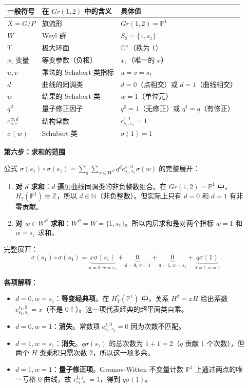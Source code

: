 \begin{center}
\begin{tabular}{p{3.5cm}p{5cm}p{5cm}}
\hline
\textbf{一般符号} & \textbf{在 $Gr(1,2)$ 中的含义} & \textbf{具体值} \\ \hline
$X = G/P$ & 旗流形 & $Gr(1,2) = \mathbb{P}^1$ \\
$W$ & Weyl 群 & $S_2 = \{1, s_1\}$ \\
$T$ & 极大环面 & $\mathbb{C}^\times$（秩为 1）\\
$x_i$ 变量 & 等变参数（负根） & $x_1$（唯一的 $x$）\\
$u, v$ & 乘法的 Schubert 类指标 & $u = v = s_1$ \\
$d$ & 曲线的同调类 & $d = 0$（点相交）或 $d = 1$（曲线相交）\\
$w$ & 结果的 Schubert 类 & $w = 1$（单位元）\\
$q^d$ & 量子修正因子 & $q^0 = 1$（无修正）或 $q^1 = q$（有修正）\\
$c_{u,v}^{w,d}$ & 结构常数 & $c_{s_1,s_1}^{1,1} = 1$ \\
$\sigma(w)$ & Schubert 类 & $\sigma(1) = 1$ \\
\hline
\end{tabular}
\end{center}

\textbf{第六步：求和的范围}

公式 $\sigma(s_1) \circ \sigma(s_1) = \sum_{d}\sum_{w \in W^P} q^d c_{s_1,s_1}^{w,d} \sigma(w)$ 的完整展开：

\begin{enumerate}
\item \textbf{对 $d$ 求和}：$d$ 遍历曲线同调类的非负整数组合。在 $Gr(1,2) = \mathbb{P}^1$ 中，$H_2(\mathbb{P}^1) \cong \mathbb{Z}$，所以 $d \in \mathbb{N}$（非负整数）。但实际上只有 $d = 0$ 和 $d = 1$ 有非零贡献。

\item \textbf{对 $w \in W^P$ 求和}：$W^{P} = W = \{1, s_1\}$。所以内层求和是对两个指标 $w = 1$ 和 $w = s_1$ 求和。
\end{enumerate}

完整展开：
$$\sigma(s_1) \circ \sigma(s_1) = \underbrace{x\sigma(s_1)}_{d=0, w=s_1} + \underbrace{0}_{d=0, w=1} + \underbrace{0}_{d=1, w=s_1} + \underbrace{q\sigma(1)}_{d=1, w=1}.$$

\textbf{各项解释}：
\begin{itemize}
\item $d=0, w=s_1$：\textbf{等变经典项}。在 $H_T^*(\mathbb{P}^1)$ 中，关系 $H^2 = xH$ 给出系数 $c_{s_1,s_1}^{s_1,0} = x$（不是 0！）。这一项代表经典的超平面类自乘。
\item $d=0, w=1$：\textbf{消失}。常数项 $c_{s_1,s_1}^{1,0} = 0$ 因为次数不匹配。
\item $d=1, w=s_1$：\textbf{消失}。$q\sigma(s_1)$ 的总次数为 $1 + 1 = 2$（$q$ 贡献 1 个次数），但两个 $H$ 类乘积只需次数 2，所以这一项多余。
\item $d=1, w=1$：\textbf{量子修正项}。Gromov-Witten 不变量计数 $\mathbb{P}^1$ 上通过两点的唯一亏格 0 曲线，故 $c_{s_1,s_1}^{1,1} = 1$，得到 $q\sigma(1)$。
\end{itemize}

